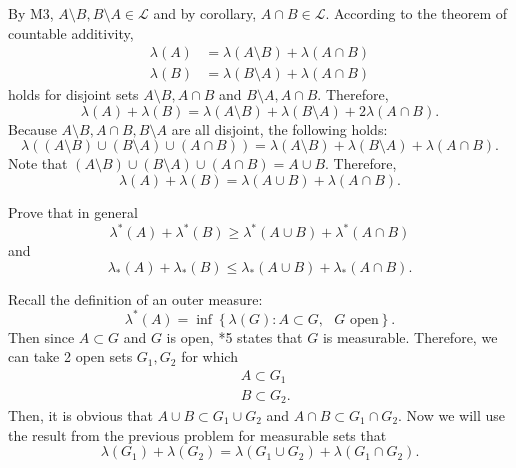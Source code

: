 \documentclass[answers]{exam}
\begin{document}
\begin{questions}
\begin{solution}
   By M3, $A\setminus B, B\setminus A \in \mathcal{L}$ and by corollary, $A\cap B \in \mathcal{L}$. According to the theorem of countable additivity,
   \begin{align*}
   \lambda\left(A\right) &= \lambda\left(A\setminus B\right) + \lambda\left(A \cap B\right)\\
   \lambda\left(B\right) &= \lambda\left(B\setminus A\right) + \lambda\left(A \cap B\right)
   \end{align*}
   holds for disjoint sets $A\setminus B, A\cap B$ and $B\setminus A, A\cap B$. Therefore,
   $$
   \lambda\left(A\right) + \lambda\left(B\right) = \lambda\left(A\setminus B\right) + \lambda\left(B\setminus A\right) + 2\lambda\left(A\cap B\right).
   $$
   Because $A \setminus B, A \cap B, B\setminus A$ are all disjoint, the following holds:
   $$
   \lambda\left(\left(A\setminus B\right) \cup \left(B\setminus A\right) \cup \left(A\cap B\right) \right) = \lambda\left(A\setminus B\right) + \lambda\left(B\setminus A\right) + \lambda\left(A\cap B\right).
   $$
   Note that $\left(A\setminus B\right) \cup \left(B\setminus A\right) \cup \left(A\cap B\right) = A \cup B$. Therefore,
   $$
   \lambda\left(A\right) + \lambda\left(B\right) = \lambda\left(A \cup B\right) + \lambda\left(A\cap B\right).
   $$
   \end{solution}
   \question
   Prove that in general
   $$
   \lambda^{*}\left(A\right) + \lambda^{*}\left(B\right) \geq \lambda^{*}\left(A\cup B\right)+\lambda^{*}\left(A \cap B\right)
   $$
   and
   $$
   \lambda_{*}\left(A\right) + \lambda_{*}\left(B\right) \leq \lambda_{*}\left(A\cup B\right)+\lambda_{*}\left(A \cap B\right).
   $$
   \begin{solution}
   Recall the definition of an outer measure:
   $$
   \lambda^{*}\left(A\right) = \inf \left\{\lambda\left(G\right): A \subset G, \text{ $G$ open} \right\}.
   $$
   Then since $A \subset G$ and $G$ is open, *5 states that $G$ is measurable. Therefore, we can take 2 open sets $G_{1}, G_{2}$ for which
   \begin{align*}
   &A \subset G_{1}\\
   &B \subset G_{2}.
   \end{align*}
   Then, it is obvious that $A \cup B \subset G_{1}\cup G_{2}$ and $A \cap B \subset G_{1}\cap G_{2}$. Now we will use the result from the previous problem for measurable sets that
   $$
   \lambda\left(G_{1}\right) + \lambda\left(G_{2}\right) = \lambda\left(G_{1}\cup G_{2}\right) + \lambda\left(G_{1}\cap G_{2}\right).
   $$
   \end{solution}

\end{questions}
\end{document}

